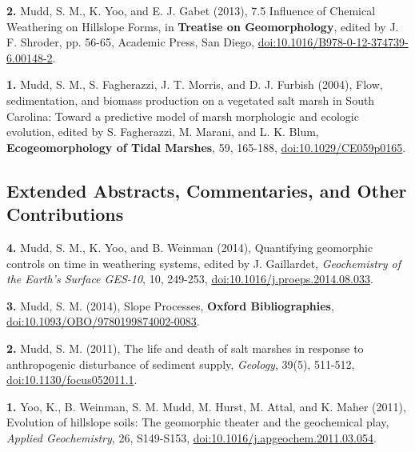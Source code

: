\documentclass[10pt, a4paper]{article}
\newcommand{\years}[1]{\marginnote{\scriptsize #1}}
\begin{document}
\years{2013}\hangindent=0.7cm\textbf{2.} Mudd, S. M., K. Yoo, and E. J. Gabet (2013), 7.5 Influence of Chemical Weathering on Hillslope Forms, in \textbf{Treatise on Geomorphology}, edited by J. F. Shroder, pp. 56-65, Academic Press, San Diego, \href{http://dx.doi.org/doi:10.1016/B978-0-12-374739-6.00148-2}{doi:10.1016/B978-0-12-374739-6.00148-2}.\par

\years{2004}\hangindent=0.7cm\textbf{1.} Mudd, S. M., S. Fagherazzi, J. T. Morris, and D. J. Furbish (2004), Flow, sedimentation, and biomass production on a vegetated salt marsh in South Carolina: Toward a predictive model of marsh morphologic and ecologic evolution, edited by S. Fagherazzi, M. Marani, and L. K. Blum, \textbf{Ecogeomorphology of Tidal Marshes}, 59, 165-188, \href{http://dx.doi.org/doi:10.1029/CE059p0165}{doi:10.1029/CE059p0165}.\par

\subsection*{Extended Abstracts, Commentaries, and Other Contributions}
\noindent
\years{2014}\hangindent=0.7cm\textbf{4.} Mudd, S. M., K. Yoo, and B. Weinman (2014), Quantifying geomorphic controls on time in weathering systems, edited by J. Gaillardet, \textit{Geochemistry of the Earth's Surface GES-10}, 10, 249-253, \href{http://dx.doi.org/doi:10.1016/j.proeps.2014.08.033}{doi:10.1016/j.proeps.2014.08.033}.\par
\hangindent=0.7cm\textbf{3.} Mudd, S. M. (2014), Slope Processes, \textbf{Oxford Bibliographies}, \href{http://dx.doi.org/doi:10.1093/OBO/9780199874002-0083}{doi:10.1093/OBO/9780199874002-0083}.\par 
\years{2011}\hangindent=0.7cm\textbf{2.} Mudd, S. M. (2011), The life and death of salt marshes in response to anthropogenic disturbance of sediment supply, \textit{Geology}, 39(5), 511-512, \href{http://dx.doi.org/doi:10.1130/focus052011.1}{doi:10.1130/focus052011.1}.\par
\years{2009}\hangindent=0.7cm\textbf{1.} Yoo, K., B. Weinman, S. M. Mudd, M. Hurst, M. Attal, and K. Maher (2011), Evolution of hillslope soils: The geomorphic theater and the geochemical play, \textit{Applied Geochemistry}, 26, S149-S153, \href{http://dx.doi.org/doi:10.1016/j.apgeochem.2011.03.054}{doi:10.1016/j.apgeochem.2011.03.054}.\par

\vfill{}
\end{document}
